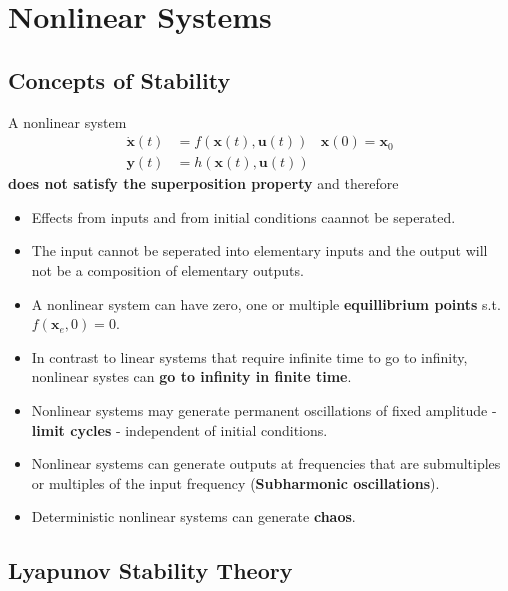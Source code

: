 \section{Nonlinear Systems}

\subsection{Concepts of Stability}
A nonlinear system
\noindent\begin{align*}
    \dot{\mathbf{x}}(t) & = f(\mathbf{x}(t), \mathbf{u}(t)) & \mathbf{x}(0)=\mathbf{x}_0 \\
    \mathbf{y}(t)       & = h(\mathbf{x}(t), \mathbf{u}(t))
\end{align*}
\textbf{does not satisfy the superposition property} and therefore
\begin{itemize}
    \item Effects from inputs and from initial conditions caannot be seperated.
    \item The input cannot be seperated into elementary inputs and the output will not be a composition of elementary outputs.
\end{itemize}

\newpar{}
\begin{itemize}
    \item A nonlinear system can have zero, one or multiple \textbf{equillibrium points} s.t.\ $f(\mathbf{x}_e, 0)=0$.
    \item In contrast to linear systems that require infinite time to go to infinity, nonlinear systes can \textbf{go to infinity in finite time}.
    \item Nonlinear systems may generate permanent oscillations of fixed amplitude - \textbf{limit cycles} - independent of initial conditions.
    \item Nonlinear systems can generate outputs at frequencies that are submultiples or multiples of the input frequency (\textbf{Subharmonic oscillations}).
    \item Deterministic nonlinear systems can generate \textbf{chaos}.
\end{itemize}

\subsection{Lyapunov Stability Theory}
